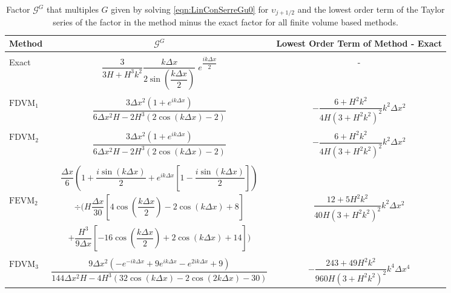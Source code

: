\begin{landscape}
	\begin{table}
		\centering   
		\begin{tabular}{l  c  c}
			Method& $\mathcal{G}^G$ & Lowest Order Term of Method - Exact \T \\
			\hline \\ 
			Exact &  $\dfrac{3 }{3H + H^3k^2} \dfrac{k\Delta x}{2 \sin\left(\dfrac{k \Delta x}{2}\right)} \;e^{\dfrac{ik\Delta x}{2}}$ & - \\ \\
			$\text{FDVM}_1$& $\dfrac{3\Delta x^2 \left(1 + e^{ik\Delta x}\right)}{6\Delta x^2 H - 2H^3 \left(2\cos\left(k\Delta x\right) - 2\right)}$ & $-\dfrac{6 +H^2k^2}{4H \left(3 + H^2k^2\right)^2}k^2 \Delta x^2$  \\ \\
			$\text{FDVM}_2$& $\dfrac{3 \Delta x^2 \left({1 + e^{ik\Delta x}}\right)}{6 \Delta x^2 H - 2H^3 \left(2\cos\left(k\Delta x\right) - 2\right)}$ & $-\dfrac{6 +H^2k^2}{4H \left(3 + H^2k^2\right)^2}k^2 \Delta x^2$  \\ \\
			& $\dfrac{\Delta x}{6} \left(1 + \dfrac{i \sin\left(k \Delta x\right)}{2} + e^{ik\Delta x}\left[1 - \dfrac{i \sin\left(k \Delta x\right)}{2}\right] \right)$ & \\  $\text{FEVM}_2$ & $\div  \Bigg( H\dfrac{\Delta x}{30} \left[4\cos\left(\dfrac{k \Delta x}{2}\right) - 2\cos\left({k \Delta x}\right) + 8\right] $  & $\dfrac{12 + 5H^2k^2}{40H \left(3 + H^2k^2\right)^2}k^2 \Delta x^2$ \\ &$+ \dfrac{H^3 }{9\Delta x}\left[-16\cos\left(\dfrac{k\Delta x}{2}\right) + 2 \cos\left(k \Delta x\right) + 14\right]    \Bigg)$ & \\ \\
			$\text{FDVM}_3$&  $\dfrac{9 \Delta x^2 \left({-e^{-ik\Delta x} + 9e^{ik\Delta x} - e^{2ik\Delta x} + 9}\right)}{144 \Delta x^2H - 4H^3\left(32\cos\left(k \Delta x\right) -2\cos\left(2k \Delta x\right) - 30\right)}$ & $-\dfrac{243 + 49H^2k^2}{960H\left(3 + H^2k^2\right)^2}k^4 \Delta x^4$ \T \B \\
			\hline
		\end{tabular}
		\caption{Factor $\mathcal{G}^G$ that multiples $G$ given by solving \eqref{eqn:LinConSerreGu0} for $\upsilon_{j+1/2}$ and the lowest order term of the Taylor series of the factor in the method minus the exact factor for all finite volume based methods.}
		\label{tab:GGfactor} 
	\end{table}
\end{landscape}


